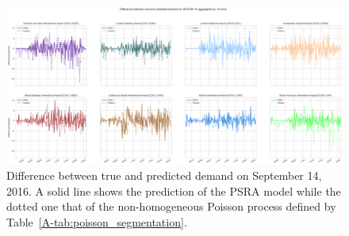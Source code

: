 \documentclass[draft,review]{elsarticle}
\begin{document}
\begin{figure}
    \includegraphics[width=\textwidth]{prediction_last_day}
    \caption{Difference between true and predicted demand on September 14, 2016. A solid line shows the prediction of the \acs{PSRA} model while the dotted one that of the non-homogeneous Poisson process defined by Table~\ref{A-tab:poisson_segmentation}.}\label{fig:pred_last_day}
\end{figure}
\end{document}

